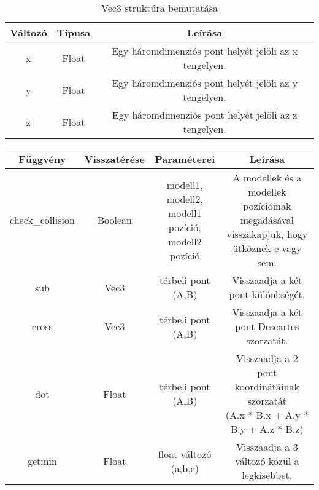 \begin{table}[h]
	\centering
	\begin{tabular}{|c|c|c|}
		\hline
		\textbf{Változó}     & \textbf{Típusa}& \textbf{Leírása}\\ \hline
		x&Float&Egy háromdimenziós pont helyét jelöli az x tengelyen.\\ \hline
		y&Float&Egy háromdimenziós pont helyét jelöli az y tengelyen.\\ \hline
		z&Float&Egy háromdimenziós pont helyét jelöli az z tengelyen.\\ \hline
		
	\end{tabular}
	\caption{Vec3 struktúra bemutatása}
	\label{tab:strukt}
\end{table}

\begin{table}[h]
	\centering
	\begin{tabular}{|c|c|c|c|}
		\hline
		\textbf{Függvény} & \textbf{Visszatérése}    & \textbf{Paraméterei}& \textbf{Leírása}\\ \hline
		
		check\_collision&Boolean&\parbox{3cm}{\centering modell1,\\modell2,\\modell1 pozíció,\\modell2 pozíció}&\parbox[c][3cm][c]{4.3cm}{\centering A modellek és a modellek pozícióinak megadásával visszakapjuk, hogy ütköznek-e vagy sem.}\\ \hline
		
		sub&Vec3&\parbox{2.7cm}{ térbeli pont\\(A,B)}&\parbox[c][1.5cm][c]{4.3cm}{\centering Visszaadja a két pont különbségét.}\\ \hline
		
		cross&Vec3&\parbox{2.7cm}{ térbeli pont\\(A,B)}&\parbox[c][1.5cm][c]{4.3cm}{\centering Visszaadja a két pont Descartes szorzatát.}\\ \hline
		
		dot&Float&\parbox{2.7cm}{ térbeli pont\\(A,B)}&\parbox[c][3cm][c]{4.3cm}{\centering Visszaadja a 2 pont koordinátáinak szorzatát\\(A.x * B.x + A.y * B.y + A.z * B.z)}\\ \hline
		
		getmin&Float&\parbox{2.7cm}{ float változó\\(a,b,c)}&\parbox[c][1.5cm][c]{4.3cm}{\centering Visszaadja a 3 változó közül a legkisebbet.}\\ \hline
		

\end{tabular}
\end{table}
